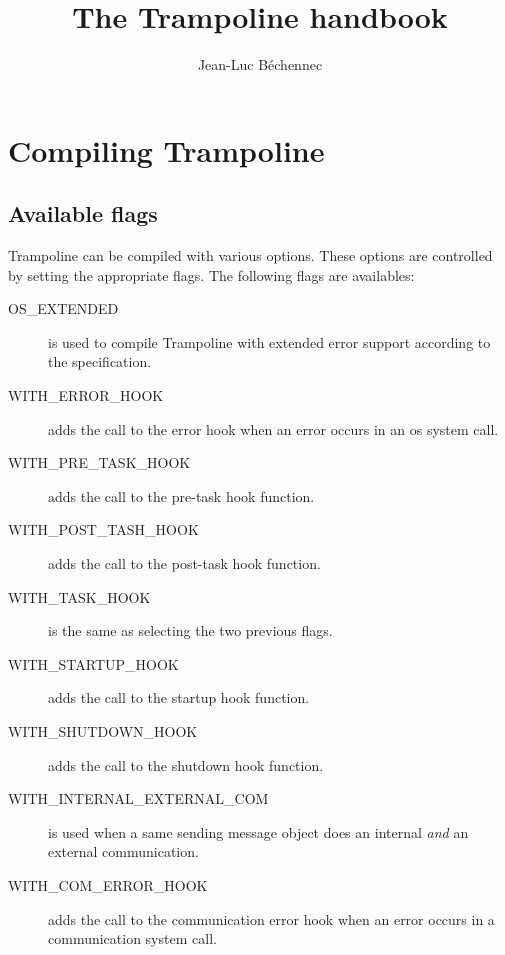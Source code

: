 \documentclass[11pt]{report}
\title{\Huge{The Trampoline handbook}}
\author{Jean-Luc B\'echennec}
\begin{document}
\maketitle

\chapter{Compiling Trampoline}

\section{Available flags}

Trampoline can be compiled with various options. These options are controlled by setting the appropriate flags. The following flags are availables:
\begin{description}
\item[OS\_EXTENDED] is used to compile Trampoline with extended error support according to the specification.
\item[WITH\_ERROR\_HOOK] adds the call to the error hook when an error occurs in an os system call.
\item[WITH\_PRE\_TASK\_HOOK] adds the call to the pre-task hook function.
\item[WITH\_POST\_TASH\_HOOK]  adds the call to the post-task hook function.
\item[WITH\_TASK\_HOOK] is the same as selecting the two previous flags.
\item[WITH\_STARTUP\_HOOK] adds the call to the startup hook function.
\item[WITH\_SHUTDOWN\_HOOK] adds the call to the shutdown hook function.
\item[WITH\_INTERNAL\_EXTERNAL\_COM] is used when a same sending message object does an internal \emph{and} an external communication.
\item[WITH\_COM\_ERROR\_HOOK] adds the call to the communication error hook when an error occurs in a communication system call.
\end{description}

 
\end{document}

